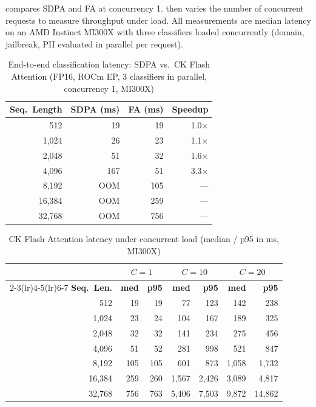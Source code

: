  compares SDPA and FA at concurrency 1.
 then varies the number of concurrent requests to measure throughput under load.
All measurements are median latency on an AMD Instinct MI300X with three classifiers loaded concurrently (domain, jailbreak, PII evaluated in parallel per request).

\begin{table}[htbp]
\centering
\caption{End-to-end classification latency: SDPA vs.\ CK Flash Attention (FP16, ROCm EP, 3 classifiers in parallel, concurrency 1, MI300X)}
\label{tab:fa_vs_sdpa}
\begin{tabular}{rrrr}
\toprule
\textbf{Seq.\ Length} & \textbf{SDPA (ms)} & \textbf{FA (ms)} & \textbf{Speedup} \\
\midrule
512       & 19    & 19    & 1.0$\times$ \\
1{,}024   & 26    & 23    & 1.1$\times$ \\
2{,}048   & 51    & 32    & 1.6$\times$ \\
4{,}096   & 167   & 51    & 3.3$\times$ \\
8{,}192   & OOM   & 105   & --- \\
16{,}384  & OOM   & 259   & --- \\
32{,}768  & OOM   & 756   & --- \\
\bottomrule
\end{tabular}
\end{table}

\begin{table}[htbp]
\centering
\caption{CK Flash Attention latency under concurrent load (median / p95 in ms, MI300X)}
\label{tab:fa_concurrency}
\begin{tabular}{rrrrrrr}
\toprule
 & \multicolumn{2}{c}{\textbf{$C{=}1$}} & \multicolumn{2}{c}{\textbf{$C{=}10$}} & \multicolumn{2}{c}{\textbf{$C{=}20$}} \\
\cmidrule(lr){2-3}\cmidrule(lr){4-5}\cmidrule(lr){6-7}
\textbf{Seq.\ Len.} & \textbf{med} & \textbf{p95} & \textbf{med} & \textbf{p95} & \textbf{med} & \textbf{p95} \\
\midrule
512       & 19   & 19    & 77    & 123   & 142   & 238 \\
1{,}024   & 23   & 24    & 104   & 167   & 189   & 325 \\
2{,}048   & 32   & 32    & 141   & 234   & 275   & 456 \\
4{,}096   & 51   & 52    & 281   & 998   & 521   & 847 \\
8{,}192   & 105  & 105   & 601   & 873   & 1{,}058 & 1{,}732 \\
16{,}384  & 259  & 260   & 1{,}567 & 2{,}426 & 3{,}089 & 4{,}817 \\
32{,}768  & 756  & 763   & 5{,}406 & 7{,}503 & 9{,}872 & 14{,}862 \\
\bottomrule
\end{tabular}
\end{table}

